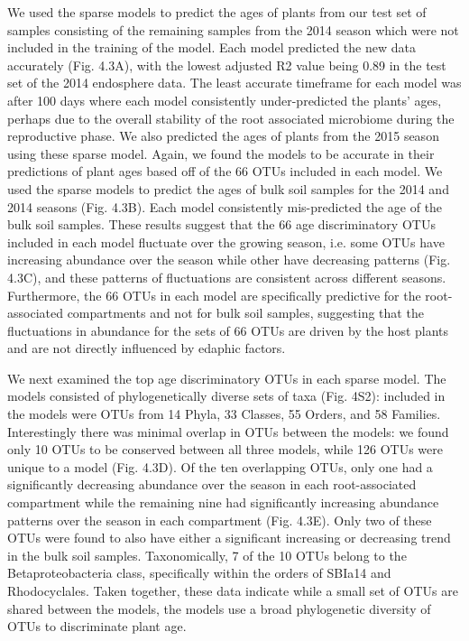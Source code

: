 We used the sparse models to predict the ages of plants from our test set of samples consisting of the remaining samples from the 2014 season which were not included in the training of the model. Each model predicted the new data accurately (Fig. 4.3A), with the lowest adjusted R2 value being 0.89 in the test set of the 2014 endosphere data. The least accurate timeframe for each model was after 100 days where each model consistently under-predicted the plants' ages, perhaps due to the overall stability of the root associated microbiome during the reproductive phase. We also predicted the ages of plants from the 2015 season using these sparse model. Again, we found the models to be accurate in their predictions of plant ages based off of the 66 OTUs included in each model. We used the sparse models to predict the ages of bulk soil samples for the 2014 and 2014 seasons (Fig. 4.3B). Each model consistently mis-predicted the age of the bulk soil samples. These results suggest that the 66 age discriminatory OTUs included in each model fluctuate over the growing season, i.e. some OTUs have increasing abundance over the season while other have decreasing patterns (Fig. 4.3C), and these patterns of fluctuations are consistent across different seasons. Furthermore, the 66 OTUs in each model are specifically predictive for the root-associated compartments and not for bulk soil samples, suggesting that the fluctuations in abundance for the sets of 66 OTUs are driven by the host plants and are not directly influenced by edaphic factors.

We next examined the top age discriminatory OTUs in each sparse model. The models consisted of phylogenetically diverse sets of taxa (Fig. 4S2): included in the models were OTUs from 14 Phyla, 33 Classes, 55 Orders, and 58 Families. Interestingly there was minimal overlap in OTUs between the models: we found only 10 OTUs to be conserved between all three models, while 126 OTUs were unique to a model (Fig. 4.3D). Of the ten overlapping OTUs, only one had a significantly decreasing abundance over the season in each root-associated compartment while the remaining nine had significantly increasing abundance patterns over the season in each compartment (Fig. 4.3E). Only two of these OTUs were found to also have either a significant increasing or decreasing trend in the bulk soil samples. Taxonomically, 7 of the 10 OTUs belong to the Betaproteobacteria class, specifically within the orders of SBIa14 and Rhodocyclales. Taken together, these data indicate while a small set of OTUs are shared between the models, the models use a broad phylogenetic diversity of OTUs to discriminate plant age.


